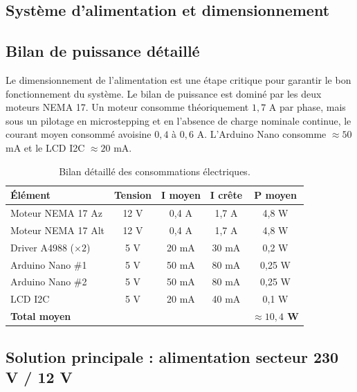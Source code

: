 \documentclass[12pt,a4paper]{report}
\begin{document}
\begin{enumerate}
\section{Système d'alimentation et dimensionnement}

\subsection{Bilan de puissance détaillé}
Le dimensionnement de l'alimentation est une étape critique pour garantir le bon
fonctionnement du système. Le bilan de puissance est dominé par les deux moteurs
NEMA 17. Un moteur consomme théoriquement $1{,}7$ A par phase, mais sous un
pilotage en microstepping et en l'absence de charge nominale continue, le courant
moyen consommé avoisine $0{,}4$ à $0{,}6$ A. L'Arduino Nano consomme
$\approx 50$ mA et le LCD I2C $\approx 20$ mA.

\begin{table}[H]
    \centering
    \caption{Bilan détaillé des consommations électriques.}
    \begin{tabular}{|l|c|c|c|c|}
        \hline
        \textbf{Élément} & \textbf{Tension} & \textbf{I moyen} & \textbf{I crête} & \textbf{P moyen} \\
        \hline
        Moteur NEMA 17 Az    & 12 V & 0,4 A  & 1,7 A  & 4,8 W  \\
        Moteur NEMA 17 Alt   & 12 V & 0,4 A  & 1,7 A  & 4,8 W  \\
        Driver A4988 ($\times 2$) & 5 V & 20 mA & 30 mA & 0,2 W \\
        Arduino Nano \#1     & 5 V  & 50 mA  & 80 mA  & 0,25 W \\
        Arduino Nano \#2     & 5 V  & 50 mA  & 80 mA  & 0,25 W \\
        LCD I2C              & 5 V  & 20 mA  & 40 mA  & 0,1 W  \\
        \hline
        \textbf{Total moyen} & & & & \textbf{$\approx 10{,}4$ W} \\
        \hline
    \end{tabular}
\end{table}

\subsection{Solution principale : alimentation secteur 230 V / 12 V}


\end{enumerate}
\end{document}
